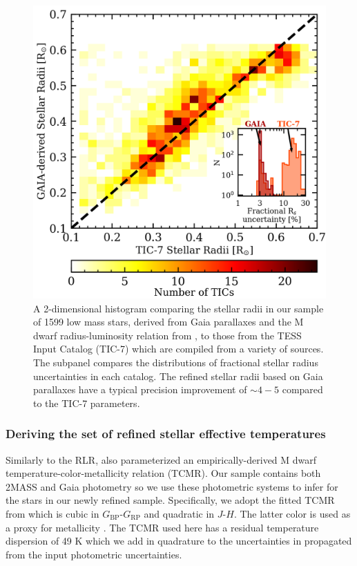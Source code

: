 \begin{figure}
  \centering
  \includegraphics[width=0.6\hsize]{figures/stellarradii.png}
  \caption[Comparison of stellar radii derived from Gaia parallaxes to values in the TIC-7.]
          {A 2-dimensional histogram comparing the stellar radii in our sample of 1599 low mass stars,
    derived from Gaia parallaxes and the M dwarf radius-luminosity relation from \cite{mann15}, to those
    from the TESS Input Catalog (TIC-7) which are compiled from a variety of sources. The subpanel compares the
    distributions of fractional stellar radius uncertainties in each catalog. The refined stellar radii 
    based on Gaia parallaxes have a typical precision improvement of $\sim 4-5$ compared to the TIC-7
    parameters.}
  \label{fig:Rs}
\end{figure}

\subsubsection{Deriving the set of refined stellar effective temperatures}
Similarly to the RLR, \cite{mann15} also parameterized an empirically-derived M dwarf temperature-color-metallicity
relation (TCMR). Our sample contains both 2MASS and Gaia photometry so we use these photometric systems to infer
\teff{} for the stars in our newly refined sample. Specifically, we adopt the fitted TCMR from \cite{mann15} which is
cubic in $G_{\text{BP}}$-$G_{\text{RP}}$ and quadratic in $J$-$H$. The latter color is used as a proxy for metallicity
\citep{leggett92,johnson12,mann13,newton14}. The TCMR used here has a residual temperature dispersion of 49 K which we
add in quadrature to the uncertainties in \teff{} propagated from the input photometric uncertainties.

